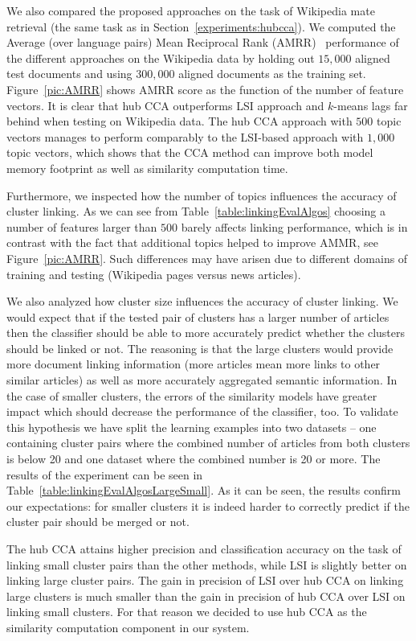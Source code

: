 We also compared the proposed approaches on the task of Wikipedia mate retrieval 
(the same task as in Section~\ref{experiments:hubcca}). We computed the Average 
(over language pairs) Mean Reciprocal Rank (AMRR)~\cite{voorhees1999trec} 
performance of the different approaches on the  Wikipedia data by holding out $15,000$ 
aligned test documents and using $300,000$ aligned documents as the training set. 
Figure~\ref{pic:AMRR} shows AMRR score as the function of the number of feature vectors. 
It is clear that hub CCA outperforms LSI approach and $k$-means lags far behind when testing on Wikipedia data. 
The hub CCA approach with $500$ topic vectors manages to perform comparably 
to the LSI-based approach with $1,000$ topic vectors, which shows that the CCA
method can improve both model memory footprint as well as similarity computation time.

Furthermore, we inspected how the number of topics influences the accuracy of cluster linking. 
As we can see from Table~\ref{table:linkingEvalAlgos} choosing a number of features larger 
than $500$ barely affects linking performance, which is in contrast with the fact that additional 
topics helped to improve AMMR, see Figure~\ref{pic:AMRR}. Such differences may have arisen 
due to different domains of training and testing (Wikipedia pages versus news articles).

We also analyzed how cluster size influences the accuracy of cluster linking. We would 
expect that if the tested pair of clusters has a larger number of articles then the 
classifier should be able to more accurately predict whether the clusters should be linked 
or not. The reasoning is that the large clusters would provide more document linking information 
(more articles mean more links to other similar articles) as well as more accurately aggregated 
semantic information. In the case of smaller clusters, the errors of the similarity models have 
greater impact which should decrease the performance of the classifier, too. To validate this 
hypothesis we have split the learning examples into two datasets -- one containing cluster 
pairs where the combined number of articles from both clusters is below 20 and one dataset 
where the combined number is 20 or more. The results of the experiment can be seen in 
Table~\ref{table:linkingEvalAlgosLargeSmall}. As it can be seen, the results confirm our 
expectations: for smaller clusters it is indeed harder to correctly predict if the cluster 
pair should be merged or not.

The hub CCA attains higher precision and classification accuracy on the task of linking 
small cluster pairs than the other methods, while LSI is slightly better on linking large 
cluster pairs. The gain in precision of LSI over hub CCA on linking large clusters is much 
smaller than the gain in precision of hub CCA over LSI on linking small clusters. For that 
reason we decided to use hub CCA as the similarity computation component in our system.

